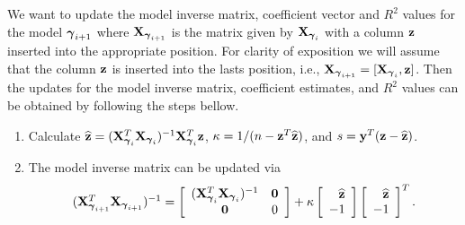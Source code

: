 \documentclass{article}[12pt]
\begin{document}
We want to update the model inverse matrix, coefficient vector and $R^2$ values for the model ${\boldsymbol \gamma}_{i+1}$ where ${\bf X}_{{\boldsymbol \gamma}_{i+1}}$ is the matrix given by ${\bf X}_{{\boldsymbol \gamma}_i}$ with a column ${\bf z}$ inserted into the appropriate position.
For clarity of exposition we will assume that the column ${\bf z}$ is inserted into the lasts position, i.e., ${\bf X}_{{\boldsymbol \gamma}_{i+1}} = [{\bf X}_{{\boldsymbol \gamma}_{i}},{\bf z}]$.
Then the updates for the model inverse matrix, coefficient estimates, and $R^2$ values can be obtained by following the steps bellow.
\begin{enumerate}
	\item Calculate $\widehat{{\bf z}} = ({\bf X}_{{\boldsymbol \gamma}_i}^T{\bf X}_{{\boldsymbol \gamma}_i})^{-1}{\bf X}_{{\boldsymbol \gamma}_i}^T{\bf z}$, 
	$\kappa 
	= 1/(n - {\bf z}^T\widehat{{\bf z}})$, and  $s = {\bf y}^T({\bf z} - \widehat{{\bf z}})$.
	
	\item The model inverse matrix can be updated via  
	$$
	\begin{array}{rl}
	(\mX_{\vgamma_{i+1}}^T\mX_{\vgamma_{i+1}})^{-1}
	
	\ds = 
	\left[ \begin{array}{cc}
	(\mX_{\vgamma_{i}}^T\mX_{\vgamma_{i}})^{-1}    & \vzero \\
	\vzero             
	& 0
	\end{array} \right] + \kappa \left[ \begin{array}{r}
	\widehat{\vz} \\
	-1 \\
	\end{array} \right] \left[ \begin{array}{r}
	\widehat{\vz} \\
	-1 \\
	\end{array} \right]^T.
	\end{array} 
	$$
	

\end{enumerate}
\end{document}
